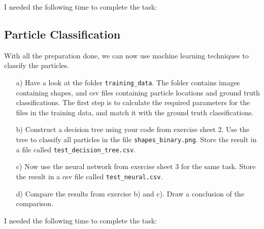\documentclass{article}
\begin{document}
I needed the following time to complete the task:

\subsection{Particle Classification}

With all the preparation done, we can now use machine learning techniques to classify the particles. 

\begin{enumerate}

\item[a)] Have a look at the folder \texttt{training\_data}. The folder contains images containing shapes, and csv files containing particle locations and ground truth classifications.
The first step is to calculate the required parameters for the files in the training data, and match it with the ground truth classifications.

\item[b)] Construct a decision tree using your code from exercise sheet 2. Use the tree to classify all particles in the file \texttt{shapes\_binary.png}. Store the result in a file called \texttt{test\_decision\_tree.csv}.

\item[c)] Now use the neural network from exercise sheet 3 for the same task. Store the result in a csv file called \texttt{test\_neural.csv}. 

\item[d)] Compare the results from exercise b) and c). Draw a conclusion of the comparison.

\end{enumerate}

I needed the following time to complete the task:
\end{document}
